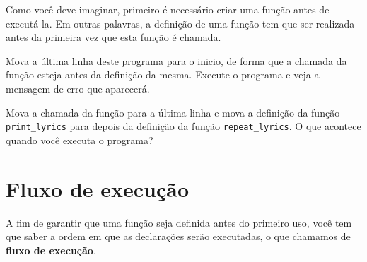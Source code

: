 

Como você deve imaginar, primeiro é necessário criar uma função antes de
executá-la. Em outras palavras, a definição de uma função tem que ser
realizada antes da primeira vez que esta função é chamada.

\begin{ex}

Mova a última linha deste programa para o inicio, de forma que a chamada da
função esteja antes da definição da mesma. Execute o programa e veja a
mensagem de erro que aparecerá.
\end{ex}

\begin{ex}

Mova a chamada da função para a última linha e mova a definição da
função \verb"print_lyrics" para depois da definição da função
\verb"repeat_lyrics". O que acontece quando você executa o programa?
\end{ex}


\section{Fluxo de execução}


A fim de garantir que uma função seja definida antes do primeiro uso, você
tem que saber a ordem em que as declarações serão executadas, o que chamamos
de {\bf fluxo de execução}.


